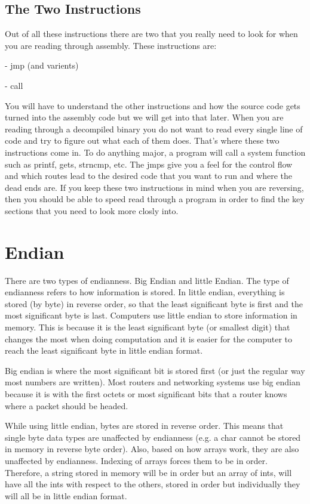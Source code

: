 \documentclass{report}
\begin{document}
\subsection{The Two Instructions}
Out of all these instructions there are two that you really need to look for
when you are reading through assembly.  These instructions are:

  - jmp (and varients)

  - call
  
You will have to understand the other instructions and how the source code gets turned
into the assembly code but we will get into that later.  When you are reading through
a decompiled binary you do not want to read every single line of code and try to figure
out what each of them does.  That's where these two instructions come in.  To do 
anything major, a program will call a system function such as printf, gets, strncmp, etc.
The jmps give you a feel for the control flow and which routes lead to the desired code
that you want to run and where the dead ends are.
If you keep these two instructions in mind when you are reversing, then you should be 
able to speed read through a program in order to find the key sections that you need to
look more closly into.



\section{Endian}
There are two types of endianness.  Big Endian and little Endian.  The type of endianness refers 
to how information is stored.  In little endian, everything is stored (by byte) in reverse order, 
so that the least significant byte is first and the most significant byte is last.  Computers use
little endian to store information in memory.  This is because it is the least significant byte 
(or smallest digit) that changes the most when doing computation and it is easier for the computer
to reach the least significant byte in little endian format.\newline

Big endian is where the most significant bit is stored first (or just the regular way most numbers are written).  Most routers and networking systems use big endian because it is with the first octets or most significant bits that a router knows where a packet should be headed.\newline

While using little endian, bytes are stored in reverse order.  This means that single byte data types are unaffected by endianness (e.g. a char cannot be stored in memory in reverse byte order).  Also, based on how arrays work, they are also unaffected by endianness.  Indexing of arrays forces them to be in order.  Therefore, a string stored in memory will be in order but an array of ints, will have all the ints with respect to the others, stored in order but individually they will all be in little endian format.
\end{document}
